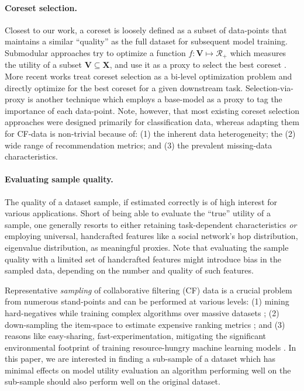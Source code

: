 \paragraph{Coreset selection.} Closest to our work, a coreset is loosely defined as a subset of data-points that maintains a similar ``quality'' as the full dataset for subsequent model training. Submodular approaches try to optimize a function $f : \mathbf{V} \mapsto \mathcal{R}_+$ which measures the utility of a subset $\mathbf{V} \subseteq \mathbf{X}$, and use it as a proxy to select the best coreset \cite{coreset_1}. More recent works treat coreset selection as a bi-level optimization problem \cite{coreset_bilevel, coreset_bilevel_2} and directly optimize for the best coreset for a given downstream task. Selection-via-proxy \cite{svp} is another technique which employs a base-model as a proxy to tag the importance of each data-point. Note, however, that 
most existing
coreset selection approaches were designed primarily for classification data, whereas adapting them for CF-data is non-trivial because of: (1) the inherent data heterogeneity; the (2) wide range of recommendation metrics; and (3) the prevalent missing-data characteristics.

\paragraph{Evaluating sample quality.} The quality of a dataset sample, if estimated correctly is of high interest for various applications. Short of being able to evaluate the ``true'' utility of a sample, one generally resorts to either retaining task-dependent characteristics \cite{evaluate_sample_quality_1} \emph{or} employing universal, handcrafted features like a social network's hop distribution, eigenvalue distribution, \etc \cite{large_graphs} as meaningful proxies. Note that evaluating the sample quality with a limited set of handcrafted features might introduce bias in the sampled data, depending on the number and quality of such features.

Representative \emph{sampling} of collaborative filtering (CF) data is a crucial problem from numerous stand-points and can be performed at various levels: (1) mining hard-negatives while training complex algorithms over massive datasets \cite{eclare, sampling_cf_nn}; (2) down-sampling the item-space to estimate expensive ranking metrics \cite{sampled_metrics, castells_sampling}; and (3) 
reasons like easy-sharing, fast-experimentation, mitigating the significant environmental footprint of training resource-hungry machine learning models \cite{google_emissions, wu2021sustainable, facebook_emissions, green_ai}. In this paper, we are interested in finding a sub-sample of a dataset which has minimal effects on model utility evaluation \ie an algorithm performing well on the sub-sample should also perform well on the original dataset.

